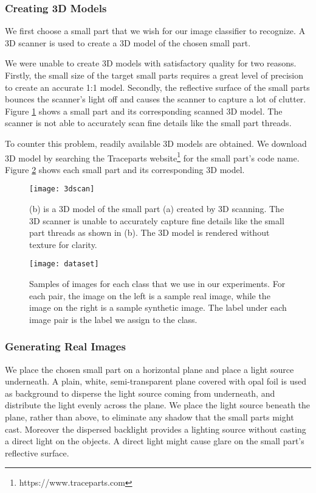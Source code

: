 \subsubsection{Creating 3D Models}
We first choose a small part that we wish for our image classifier to recognize. A 3D scanner is used to create a 3D model of the chosen small part.

We were unable to create 3D models with satisfactory quality for two reasons. Firstly, the small size of the target small parts requires a great level of precision to create an accurate 1:1 model. Secondly, the reflective surface of the small parts bounces the scanner's light off and causes the scanner to capture a lot of clutter. Figure \ref{fig:3dscans} shows a small part and its corresponding scanned 3D model. The scanner is not able to accurately scan fine details like the small part threads.

To counter this problem, readily available 3D models are obtained. We download 3D model by searching the Traceparts website\footnote{https://www.traceparts.com} for the small part's code name. Figure \ref{fig:Dataset} shows each small part and its corresponding 3D model. 

\begin{figure}[H]
\centering
  \texttt{[image: 3dscan]}
\caption{(b) is a 3D model of the small part (a) created by 3D scanning. The 3D scanner is unable to accurately capture fine details like the small part threads as shown in (b). The 3D model is rendered without texture for clarity.}
\label{fig:3dscans}
\end{figure}

\begin{figure}[H]
\centering
  \texttt{[image: dataset]}
\caption{Samples of images for each class that we use in our experiments. For each pair, the image on the left is a sample real image, while the image on the right is a sample synthetic image. The label under each image pair is the label we assign to the class.}
\label{fig:Dataset}
\end{figure}

\subsubsection{Generating Real Images}
We place the chosen small part on a horizontal plane and place a light source underneath. A plain, white, semi-transparent plane covered with opal foil is used as background to disperse the light source coming from underneath, and distribute the light evenly across the plane. We place the light source beneath the plane, rather than above, to eliminate any shadow that the small parts might cast. Moreover the dispersed backlight provides a lighting source without casting a direct light on the objects. A direct light might cause glare on the small part's reflective surface.

